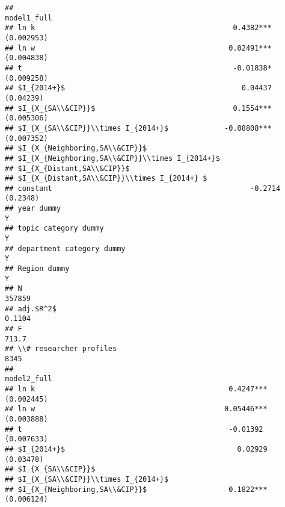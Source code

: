 \documentclass[
]{article}
\begin{document}
\begin{verbatim}
##                                                            model1_full
## ln k                                              0.4382*** (0.002953)
## ln w                                             0.02491*** (0.004838)
## t                                                 -0.01838* (0.009258)
## $I_{2014+}$                                         0.04437  (0.04239)
## $I_{X_{SA\\&CIP}}$                                0.1554*** (0.005306)
## $I_{X_{SA\\&CIP}}\\times I_{2014+}$             -0.08808*** (0.007352)
## $I_{X_{Neighboring,SA\\&CIP}}$                                        
## $I_{X_{Neighboring,SA\\&CIP}}\\times I_{2014+}$                       
## $I_{X_{Distant,SA\\&CIP}}$                                            
## $I_{X_{Distant,SA\\&CIP}}\\times I_{2014+} $                          
## constant                                              -0.2714 (0.2348)
## year dummy                                                           Y
## topic category dummy                                                 Y
## department category dummy                                            Y
## Region dummy                                                         Y
## N                                                               357859
## adj.$R^2$                                                       0.1104
## F                                                                713.7
## \\# researcher profiles                                           8345
##                                                           model2_full
## ln k                                             0.4247*** (0.002445)
## ln w                                            0.05446*** (0.003888)
## t                                                -0.01392  (0.007633)
## $I_{2014+}$                                        0.02929  (0.03478)
## $I_{X_{SA\\&CIP}}$                                                   
## $I_{X_{SA\\&CIP}}\\times I_{2014+}$                                  
## $I_{X_{Neighboring,SA\\&CIP}}$                   0.1822*** (0.006124)

\end{verbatim}
\end{document}
